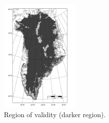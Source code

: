 \begin{figure}
  \centering
    \includegraphics[width=0.35\textwidth]{images/greenland/stats/valid.jpg}
  \caption[]{Region of validity (darker region).}
\end{figure}


